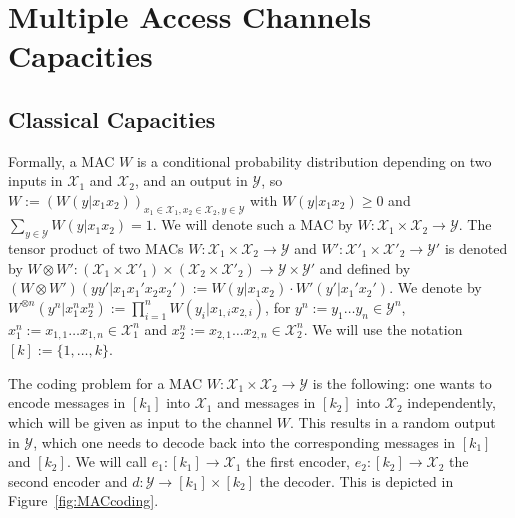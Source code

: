 \section{Multiple Access Channels Capacities}
\label{section:capacity}
\subsection{Classical Capacities}
Formally, a MAC $W$ is a conditional probability distribution depending on two inputs in $\mathcal{X}_1$ and $\mathcal{X}_2$, and an output in $\mathcal{Y}$, so $W := \left(W(y|x_1x_2)\right)_{x_1 \in \mathcal{X}_1,x_2  \in \mathcal{X}_2, y \in \mathcal{Y}}$ with $W(y|x_1x_2) \geq 0$ and $\sum_{y \in \mathcal{Y}} W(y|x_1x_2) = 1$. We will denote such a MAC by $W : \mathcal{X}_1 \times \mathcal{X}_2 \rightarrow \mathcal{Y}$. The tensor product of two MACs $W: \mathcal{X}_1 \times \mathcal{X}_2 \rightarrow \mathcal{Y}$ and $W': \mathcal{X}'_1 \times \mathcal{X}'_2 \rightarrow \mathcal{Y}'$ is denoted by $W \otimes W' : (\mathcal{X}_1 \times \mathcal{X}'_1) \times (\mathcal{X}_2 \times \mathcal{X}'_2) \to \mathcal{Y} \times \mathcal{Y}'$ and defined by $(W \otimes W')(yy'|x_1x_1'x_2x_2') := W(y|x_1x_2) \cdot W'(y'|x_1'x_2')$. We denote by $W^{\otimes n}(y^n|x_1^nx_2^n) := \prod_{i=1}^nW(y_i|x_{1,i}x_{2,i})$, for $y^n := y_1 \ldots y_n \in \mathcal{Y}^n$, $x_1^n := x_{1,1} \ldots x_{1,n} \in \mathcal{X}_1^n$ and $x_2^n := x_{2,1} \ldots x_{2,n} \in \mathcal{X}_2^n$. We will use the notation $[k]:=\{1,\ldots,k\}$.
 

The coding problem for a MAC $W : \mathcal{X}_1 \times \mathcal{X}_2 \rightarrow \mathcal{Y}$ is the following: one wants to encode messages in $[k_1]$ into $\mathcal{X}_1$ and messages in $[k_2]$ into $\mathcal{X}_2$ independently, which will be given as input to the channel $W$. This results in a random output in $\mathcal{Y}$, which one needs to decode back into the corresponding messages in $[k_1]$ and $[k_2]$. We will call $e_1 : [k_1] \rightarrow \mathcal{X}_1$ the first encoder, $e_2 : [k_2] \rightarrow \mathcal{X}_2$ the second encoder and $d : \mathcal{Y} \rightarrow [k_1] \times [k_2]$ the decoder. This is depicted in Figure~\ref{fig:MACcoding}.

